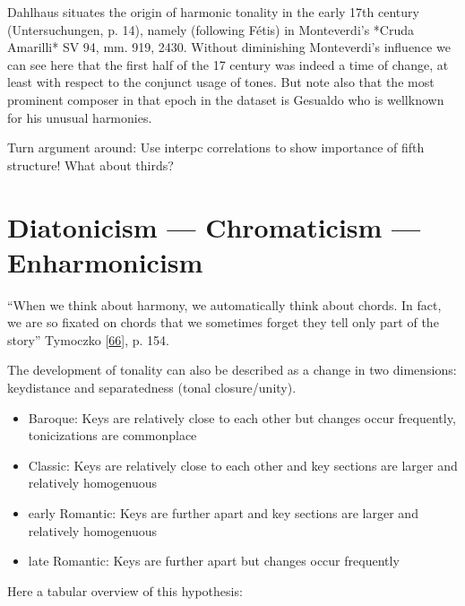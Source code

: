 \documentclass[letterpaper,10pt,english]{sphinxmanual}
\begin{document}
\sphinxAtStartPar
Dahlhaus situates the origin of harmonic tonality in the early 17th
century (Untersuchungen, p. 14), namely (following Fétis) in
Monteverdi’s *Cruda Amarilli* SV 94, mm. 9\sphinxhyphen{}19, 24\sphinxhyphen{}30. Without
diminishing Monteverdi’s influence we can see here that the first half
of the 17 century was indeed a time of change, at least with respect to
the conjunct usage of tones. But note also that the most prominent
composer in that epoch in the dataset is Gesualdo who is well\sphinxhyphen{}known for
his unusual harmonies.

\sphinxAtStartPar
Turn argument around: Use inter\sphinxhyphen{}pc correlations to show importance of
fifth structure! What about thirds?


\chapter{Diatonicism — Chromaticism — Enharmonicism}
\label{\detokenize{diatonicism_chromaticism:diatonicism-chromaticism-enharmonicism}}\label{\detokenize{diatonicism_chromaticism::doc}}
\sphinxAtStartPar
“When we think about harmony, we automatically think about chords. In
fact, we are so fixated on chords that we sometimes forget they tell
only part of the story” Tymoczko {[}\hyperlink{cite.8_bibliography:id63}{66}{]}, p. 154.

\sphinxAtStartPar
The development of tonality can also be described as a change in two
dimensions: key\sphinxhyphen{}distance and separatedness (tonal closure/unity).
\begin{itemize}
\item {} 
\sphinxAtStartPar
Baroque: Keys are relatively close to each other but changes occur
frequently, tonicizations are commonplace

\item {} 
\sphinxAtStartPar
Classic: Keys are relatively close to each other and key sections are
larger and relatively homogenuous

\item {} 
\sphinxAtStartPar
early Romantic: Keys are further apart and key sections are larger
and relatively homogenuous

\item {} 
\sphinxAtStartPar
late Romantic: Keys are further apart but changes occur frequently

\end{itemize}

\sphinxAtStartPar
Here a tabular overview of this hypothesis:
\end{document}
